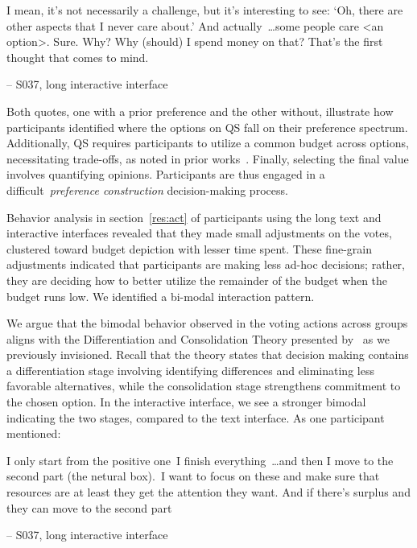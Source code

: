 \begin{displayquote}

I mean, it's not necessarily a challenge, but it's interesting to see: `Oh, there are other aspects that I never care about.' And actually~\ldots some people care <an option>. Sure. Why? Why (should) I spend money on that? That's the first thought that comes to mind.

\noindent \hfill -- S037, long interactive interface
\end{displayquote}

Both quotes, one with a prior preference and the other without, illustrate how participants identified where the options on QS fall on their preference spectrum. Additionally, QS requires participants to utilize a common budget across options, necessitating trade-offs, as noted in prior works~\cite{chengCanShowWhat2021, naylor2017first}. Finally, selecting the final value involves quantifying opinions. Participants are thus engaged in a difficult~\textit{preference construction} decision-making process.

Behavior analysis in section~\ref{res:act} of participants using the long text and interactive interfaces revealed that they made small adjustments on the votes, clustered toward budget depiction with lesser time spent. These fine-grain adjustments indicated that participants are making less ad-hoc decisions; rather, they are deciding how to better utilize the remainder of the budget when the budget runs low. We identified a bi-modal interaction pattern.

We argue that the bimodal behavior observed in the voting actions across groups aligns with the Differentiation and Consolidation Theory presented by~\textcite{svensonDifferentiationConsolidationTheory1992} as we previously invisioned. Recall that the theory states that decision making contains a differentiation stage involving identifying differences and eliminating less favorable alternatives, while the consolidation stage strengthens commitment to the chosen option. In the interactive interface, we see a stronger bimodal indicating the two stages, compared to the text interface. As one participant mentioned:

\begin{displayquote}
I only start from the positive one~\bracketellipsis I finish everything~\ldots and then I move to the second part (the netural box).~\bracketellipsis I want to focus on these and make sure that resources are at least they get the attention they want. And if there's surplus and they can move to the second part

\noindent \hfill -- S037, long interactive interface
\end{displayquote}

